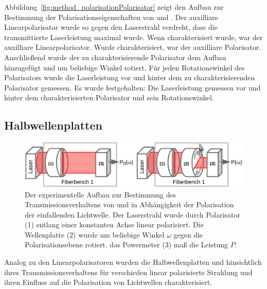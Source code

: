 \documentclass[a4paper,12pt,twoside,parskip=no,headsepline,open=right,ngerman,export]{scrreprt}
\begin{document}
            Abbildung~\ref{fig:method_polarisationPolarisator} zeigt den Aufbau zur Bestimmung der Polarisationseigenschaften von  und . Der auxilliare Linearpolarisator wurde so gegen den Laserstrahl verdreht, dass die transmittierte Laserleistung maximal wurde. Wenn  charakterisiert wurde, war  der auxilliare Linearpolarisator. Wurde  charakterisiert, war  der auxilliare Polarisator. Anschließend wurde der zu charakterisierende Polarisator dem Aufbau hinzugefügt und um beliebige Winkel rotiert. Für jeden Rotationswinkel des Polarisators wurde die Laserleistung vor und hinter dem zu charakterisierenden Polarisator gemessen. Es wurde festgehalten: Die Laserleistung gemessen vor und hinter dem charakterisierten Polarisator und sein Rotationswinkel.
            
            
            
            \subsection*{Halbwellenplatten}
            
            \begin{figure}[!b]
                \centering
                \includegraphics[width=\textwidth]{img/aufbau_wellenplatte_transmission.pdf}
                \caption[Bestimmung des Transmissionsverhaltens von Halbwellenplatten]{Der experimentelle Aufbau zur Bestimmung des Transmissionsverhaltens von  und  in Abhängigkeit der Polarisation der einfallenden Lichtwelle. Der Laserstrahl wurde durch Polarisator (1) entlang einer konstanten Achse linear polarisiert. Die Wellenplatte (2) wurde um beliebige Winkel $\omega$ gegen die Polarisationsebene rotiert. das Powermeter (3) maß die Leistung $P$.}
                \label{fig:method_transmissionWellenplatte}
            \end{figure}            
            
            Analog zu den Linearpolarisatoren wurden die Halbwellenplatten  und  hinsichtlich ihres Transmissionsverhaltens für verschieden linear polarisierte Strahlung und ihren Einfluss auf die Polarisation von Lichtwellen charakterisiert.
            
\end{document}
